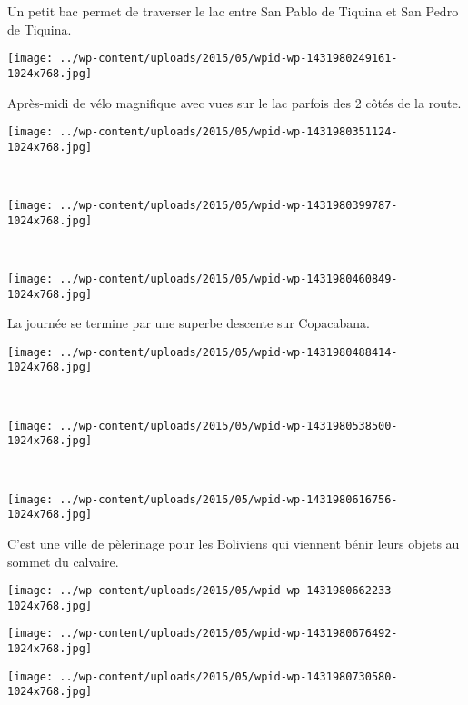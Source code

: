Un petit bac permet de traverser le lac entre San Pablo de Tiquina et San Pedro de Tiquina. 
\begin{center} \texttt{[image: ../wp-content/uploads/2015/05/wpid-wp-1431980249161-1024x768.jpg]} \end{center} 

Après-midi de vélo magnifique avec vues sur le lac parfois des 2 côtés de la route. 
\begin{center} \texttt{[image: ../wp-content/uploads/2015/05/wpid-wp-1431980351124-1024x768.jpg]} \end{center}
\vspace{-\topsep}
\pagebreak
~\\
\begin{center} \texttt{[image: ../wp-content/uploads/2015/05/wpid-wp-1431980399787-1024x768.jpg]} \end{center}
~\\
\begin{center} \texttt{[image: ../wp-content/uploads/2015/05/wpid-wp-1431980460849-1024x768.jpg]} \end{center}
\vspace{-\topsep}
\pagebreak

La journée se termine par une superbe descente sur Copacabana. 
\begin{center} \texttt{[image: ../wp-content/uploads/2015/05/wpid-wp-1431980488414-1024x768.jpg]} \end{center}
~\\
\begin{center} \texttt{[image: ../wp-content/uploads/2015/05/wpid-wp-1431980538500-1024x768.jpg]} \end{center}
\vspace{-\topsep} 
\pagebreak
~
\begin{center} \texttt{[image: ../wp-content/uploads/2015/05/wpid-wp-1431980616756-1024x768.jpg]} \end{center}

C'est une ville de pèlerinage pour les Boliviens qui viennent bénir leurs objets au sommet du calvaire. 
\begin{center} \texttt{[image: ../wp-content/uploads/2015/05/wpid-wp-1431980662233-1024x768.jpg]} \end{center}

\begin{center} \texttt{[image: ../wp-content/uploads/2015/05/wpid-wp-1431980676492-1024x768.jpg]} \end{center}
\begin{center} \texttt{[image: ../wp-content/uploads/2015/05/wpid-wp-1431980730580-1024x768.jpg]} \end{center}


